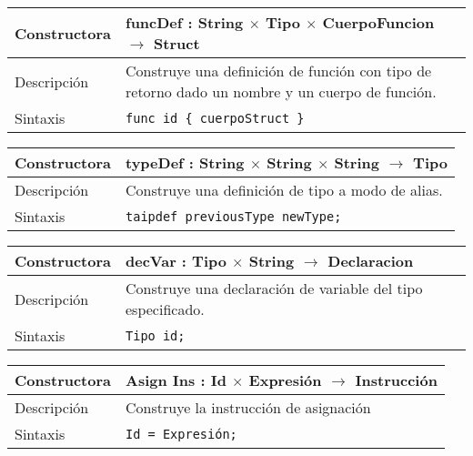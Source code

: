 \documentclass[10pt,a4paper]{article}
\begin{document}
\begin{center}
    \begin{tabular}[h]{|p{}|p{}|}
        \hline
        Constructora & funcDef : String $\times$ Tipo $\times$ CuerpoFuncion $\rightarrow$ Struct \\
        \hline
        Descripción & Construye una definición de función con tipo de retorno dado un nombre y un cuerpo de función. \\
        \hline
        Sintaxis & \texttt{func id \{ cuerpoStruct \}} \\
        \hline
    \end{tabular}
\end{center}

\begin{center}
    \begin{tabular}[h]{|p{}|p{}|}
        \hline
        Constructora & typeDef : String $\times$ String $\times$ String $\rightarrow$ Tipo \\
        \hline
        Descripción & Construye una definición de tipo a modo de alias. \\
        \hline
        Sintaxis & \texttt{taipdef previousType newType;} \\
        \hline
    \end{tabular}
\end{center}

\begin{center}
    \begin{tabular}[h]{|p{}|p{}|}
        \hline
        Constructora & decVar : Tipo $\times$ String $\rightarrow$ Declaracion \\
        \hline
        Descripción & Construye una declaración de variable del tipo especificado. \\
        \hline
        Sintaxis & \texttt{Tipo id;} \\
        \hline
    \end{tabular}
\end{center}

\begin{center}
    \begin{tabular}[h]{|p{}|p{}|}
        \hline
        Constructora & Asign Ins : Id $\times$ Expresión $\rightarrow$ Instrucción \\
        \hline
        Descripción & Construye la instrucción de asignación \\
        \hline
        Sintaxis & \texttt{Id = Expresión;} \\
        \hline
    \end{tabular}
\end{center}
\end{document}
